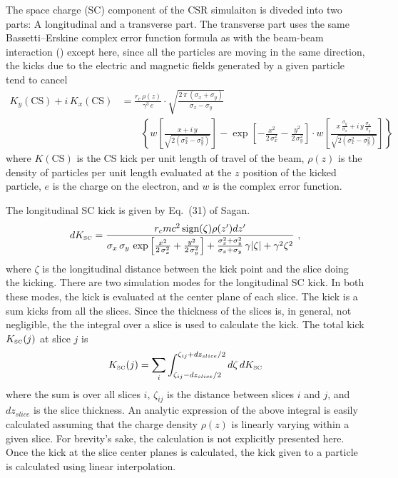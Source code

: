 The space charge (SC) component of the CSR simulaiton is diveded into two parts: A
longitudinal and a transverse part. The transverse part uses the same Bassetti--Erskine
complex error function formula\cite{b:talman} as with the beam-beam interaction
() except here, since all the particles are moving in the same
direction, the kicks due to the electric and magnetic fields generated by a given particle
tend to cancel
\begin{align}
  K_y(\text{CS}) + i \, K_x(\text{CS}) &=
  \frac{r_e \, \rho(z)}{\gamma^3 \, e} \cdot
  \sqrt{\frac{2 \, \pi \, (\sigma_x + \sigma_y)}{\sigma_x - \sigma_y}} \\
  & \qquad \left\{ w \left[ \frac{x + i \, y}{\sqrt{2 (\sigma_x^2 - \sigma_y^2)}} \right] -
  \exp \left[ -\frac{x^2}{2 \, \sigma_x^2} - \frac{y^2}{2 \, \sigma_y^2} \right] \cdot
  w \left[ \frac{x \, \frac{\sigma_y}{\sigma_x} + i \, y \, \frac{\sigma_x}{\sigma_y}}
  {\sqrt{2 (\sigma_x^2 - \sigma_y^2)}} \right] \right\}
  \nonumber \label{fsp1r}
\end{align}
where $K(\text{CS})$ is the CS kick per unit length of travel of the beam, $\rho(z)$ is
the density of particles per unit length evaluated at the $z$ position of the kicked
particle, $e$ is the charge on the electron,  and $w$ is the complex error function.

The longitudinal SC kick is given by Eq.~(31) of Sagan. 
\begin{equation}
 d K_{\mbox{\tiny SC}} =
  \frac{ r_c m c^2 \, \mbox{sign}(\zeta)\rho(z')dz'}
  {\sigma_x \, \sigma_y \, \exp
  \left[ \frac{x^2}{2 \, \sigma_x^2} + \frac{y^2}{2 \, \sigma_y^2} \right] +
  \frac{\sigma_x^2 + \sigma_y^2}{\sigma_x + \sigma_y} \, \gamma |\zeta| + \gamma^2\zeta^2}\ ,
  \label{kelsz}
\end{equation}
where $\zeta$ is the longitudinal distance between the kick point and the slice doing the
kicking.  There are two simulation modes for the longitudinal SC kick. In both these
modes, the kick is evaluated at the center plane of each slice. The kick is a sum kicks
from all the slices. Since the thickness of the slices is, in general, not negligible, the
the integral over a slice is used to calculate the kick. The total kick $K_{\mbox{\tiny
SC}}(j)$ at slice $j$ is
\begin{equation}
  K_{\mbox{\tiny SC}} (j) = 
  \sum_i \int_{\zeta_{ij}-dz_{slice}/2}^{\zeta_{ij}+dz_{slice}/2} d\zeta \, dK_{\mbox{\tiny SC}}
\end{equation}
where the sum is over all slices $i$, $\zeta_{ij}$ is the distance between slices $i$ and
$j$, and $dz_{slice}$ is the slice thickness. An analytic expression of the above integral
is easily calculated assuming that the charge density $\rho(z)$ is linearly varying within
a given slice.  For brevity's sake, the calculation is not explicitly presented here. Once
the kick at the slice center planes is calculated, the kick given to a particle is
calculated using linear interpolation.

